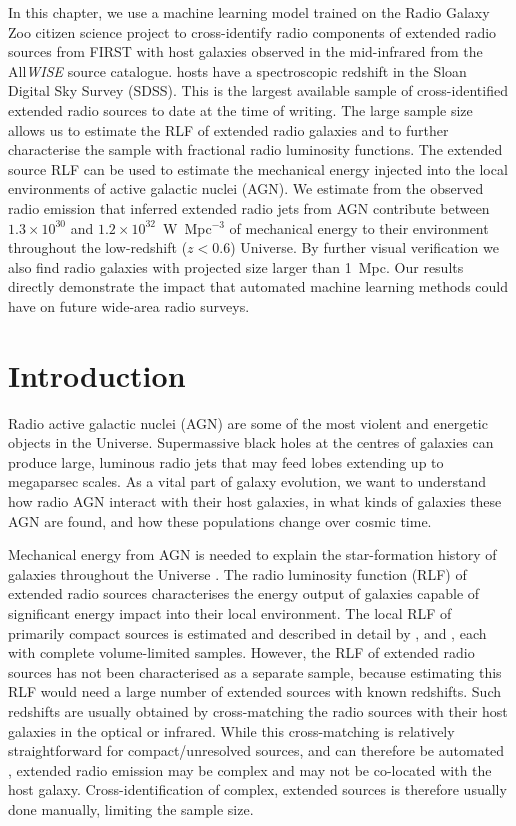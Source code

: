 In this chapter, we use a machine learning model trained on the Radio Galaxy Zoo citizen science project to cross-identify \ncomponents{} radio components of extended radio sources from FIRST with \nsources{} host galaxies observed in the mid-infrared from the All\emph{WISE} source catalogue. \nsourceszsp{} hosts have a spectroscopic redshift in the Sloan Digital Sky Survey (SDSS). This is the largest available sample of cross-identified extended radio sources to date at the time of writing. The large sample size allows us to estimate the RLF of extended radio galaxies and to further characterise the sample with fractional radio luminosity functions. The extended source RLF can be used to estimate the mechanical energy injected into the local environments of active galactic nuclei (AGN). We estimate from the observed radio emission that inferred extended radio jets from AGN contribute between $1.3 \times 10^{30}$ and $1.2 \times 10^{32}$~W~Mpc$^{-3}$ of mechanical energy to their environment throughout the low-redshift ($z < 0.6$) Universe. By further visual verification we also find \nnewgiants{} radio galaxies with projected size larger than 1~Mpc. Our results directly demonstrate the impact that automated machine learning methods could have on future wide-area radio surveys.

\section{Introduction} \label{sec:rlfs-intro}

Radio active galactic nuclei (AGN) are some of the most violent and energetic
objects in the Universe. Supermassive black holes at the centres of galaxies
can produce large, luminous radio jets that may feed lobes extending up to
megaparsec scales. As a vital part of galaxy evolution, we want to understand
how radio AGN interact with their host galaxies, in what kinds of galaxies
these AGN are found, and how these populations change over cosmic time.

Mechanical energy from AGN is needed to explain the star-formation history of galaxies throughout the Universe \citep[e.g.][]{raouf17agn,hardcastle20feedback}. The radio luminosity function (RLF) of extended radio sources characterises the energy output of galaxies capable of significant energy impact into their local environment. The local RLF of primarily compact sources is estimated and
described in detail by \citet{mauch07rlf}, \citet{pracy16rlf} and
\citet{condon19rlf}, each with complete volume-limited samples. However, the RLF of extended radio sources has not been
characterised as a separate sample, because estimating this RLF would need a large number of extended sources with known
redshifts. Such redshifts are usually obtained by cross-matching the radio
sources with their host galaxies in the optical or infrared. While this
cross-matching is relatively straightforward for compact/unresolved sources,
and can therefore be automated \citep[e.g.][]{kimball08}, extended radio
emission may be complex and may not be co-located with the host galaxy.
Cross-identification of complex, extended sources is therefore usually done
manually, limiting the sample size.

